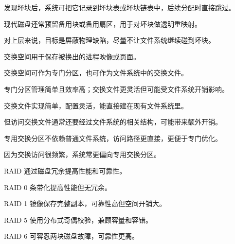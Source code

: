 \begin{points}
  \item 发现坏块后，系统可把它记录到坏块表或坏块链表中，后续分配时直接跳过。
  \item 现代磁盘还常预留备用块或备用扇区，用于对坏块做透明重映射。
  \item 对上层来说，目标是屏蔽物理缺陷，尽量不让文件系统继续碰到坏块。
\end{points}


\begin{points}
  \item 交换空间用于保存被换出的进程映像或页面。
  \item 交换空间可作为专门分区，也可作为文件系统中的交换文件。
  \item 专门分区管理简单且效率高；交换文件更灵活但可能受文件系统开销影响。
\end{points}


\begin{points}
  \item 交换文件实现简单，配置灵活，能直接建在现有文件系统里。
  \item 但访问交换文件通常还要经过文件系统的相关结构，可能带来额外开销。
  \item 专用交换分区不依赖普通文件系统，访问路径更直接，更便于专门优化。
  \item 因为交换访问很频繁，系统常更偏向专用交换分区。
\end{points}


\begin{points}
  \item RAID 通过磁盘冗余提高性能和可靠性。
  \item RAID 0 条带化提高性能但无冗余。
  \item RAID 1 镜像保存完整副本，可靠性高但空间开销大。
  \item RAID 5 使用分布式奇偶校验，兼顾容量和容错。
  \item RAID 6 可容忍两块磁盘故障，可靠性更高。
\end{points}


